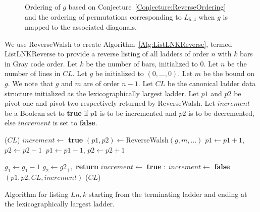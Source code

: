\begin{theorem}
\begin{theorem}
\begin{figure}[ht]
  \caption{Ordering of $g$ based on Conjecture~\ref{Conjecture:ReverseOrdering} and the ordering of permutations corresponding to $L_{5,4}$ when 
  $g$ is mapped to the associated diagonals.}
  \label{Fig:ReverseOrdering}
\end{figure}
\pagebreak

We use {\sc ReverseWalsh} to create Algorithm~\ref{Alg:ListLNKReverse}, 
termed {\sc ListLNKReverse} to provide a reverse listing of all ladders of order $n$ with $k$ bars in Gray code order. 
Let $k$ be the number of bars, initialized to $0$. Let $n$ be the number of lines in $CL$. 
Let $g$ be initialized to $(0, \dots, 0)$. Let $m$ be the bound on $g$. 
We note that $g$ and $m$ are of order $n-1$.
Let $CL$ be the canonical ladder data structure initialized as the lexicographically largest ladder. 
Let $p1$ and $p2$ be pivot one and pivot two respectively returned by {\sc ReverseWalsh}. 
Let $increment$ be a Boolean set to \textbf{true} if $p1$ is to be incremented and $p2$ is to be decremented, 
else $increment$ is set to \textbf{false}.

\begin{algorithm}
  \begin{algorithmic}[1]
      ($CL$)
      \State $increment \gets$ \textbf{true}
        \State $(p1,p2) \gets ${\sc ReverseWalsh}$(g,m, \dots)$
         $p1 \gets p1+1$, $p2 \gets p2-1$
        \Else $\: p1 \gets p1-1$, $p2 \gets p2+1$
        \EndIf

          \State $g_{1} \gets g_{1}-1$
          \State $g_{2} \gets g2_{+1}$
          \State \textbf{return}
        \EndIf
         $increment \gets $ \textbf{true} 
        \Else $:\ increment \gets $ \textbf{false}
        \EndIf
        $(p1, p2, CL, increment)$
        ($CL$)
      \EndWhile
    \EndFunction
  \end{algorithmic}
  \caption{Algorithm for listing $L{n,k}$ starting from the terminating ladder and ending at the lexicographically largest ladder.}
  \label{Alg:ListLNKReverse}
\end{algorithm} 


\end{theorem}
\end{theorem}
